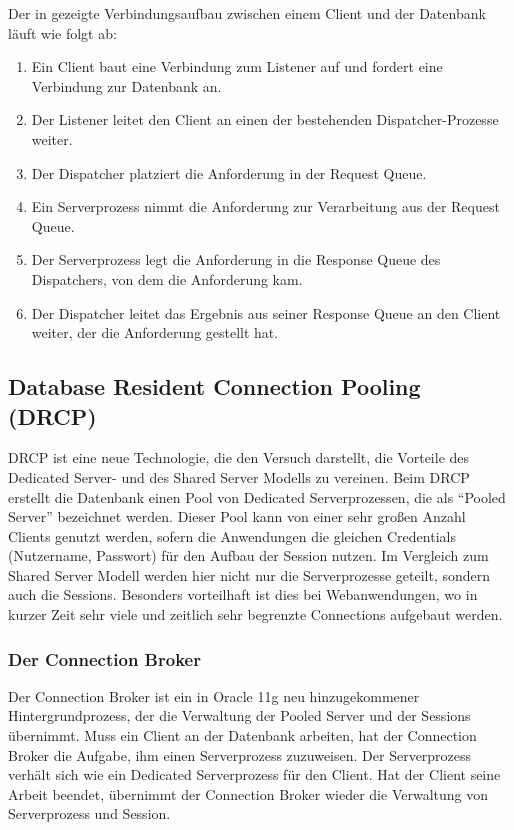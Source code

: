         Der in  gezeigte Verbindungsaufbau zwischen einem Client und der Datenbank läuft wie folgt ab:
          \begin{enumerate}
            \item Ein Client baut eine Verbindung zum Listener auf und fordert eine Verbindung zur Datenbank an.
            \item Der Listener leitet den Client an einen der bestehenden Dispatcher-Prozesse weiter.
            \item Der Dispatcher platziert die Anforderung in der Request Queue.
            \item Ein Serverprozess nimmt die Anforderung zur Verarbeitung aus der Request Queue.
            \item Der Serverprozess legt die Anforderung in die Response Queue des Dispatchers, von dem die Anforderung kam.
            \item Der Dispatcher leitet das Ergebnis aus seiner Response Queue an den Client weiter, der die Anforderung gestellt hat.
          \end{enumerate}
      \subsection{Database Resident Connection Pooling (DRCP)}
        DRCP ist eine neue Technologie, die den Versuch darstellt, die Vorteile des Dedicated Server- und des Shared Server Modells zu vereinen. Beim DRCP erstellt die Datenbank einen Pool von Dedicated Serverprozessen, die als \enquote{Pooled Server} bezeichnet werden. Dieser Pool kann von einer sehr großen Anzahl Clients genutzt werden, sofern die Anwendungen die gleichen Credentials (Nutzername, Passwort) für den Aufbau der Session nutzen. Im Vergleich zum Shared Server Modell werden hier nicht nur die Serverprozesse geteilt, sondern auch die Sessions. Besonders vorteilhaft ist dies bei Webanwendungen, wo in kurzer Zeit sehr viele und zeitlich sehr begrenzte Connections aufgebaut werden.


        \subsubsection{Der Connection Broker}
          Der Connection Broker ist ein in Oracle 11g neu hinzugekommener Hintergrundprozess, der die Verwaltung der Pooled Server und der Sessions übernimmt. Muss ein Client an der Datenbank arbeiten, hat der Connection Broker die Aufgabe, ihm einen Serverprozess zuzuweisen. Der Serverprozess verhält sich wie ein Dedicated Serverprozess für den Client. Hat der Client seine Arbeit beendet, übernimmt der Connection Broker wieder die Verwaltung von Serverprozess und Session.
